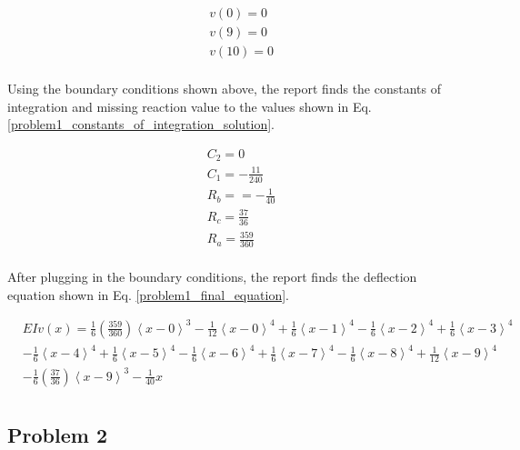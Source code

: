 \documentclass[a4paper]{article}
\begin{document}
\begin{equation}
\begin{split}
	& v(0) = 0 \\
	& v(9) = 0 \\
	& v(10) = 0 \\
\end{split}
\label{problem1_constants_of_integration}
\end{equation}

Using the boundary conditions shown above, the report finds the constants of integration and missing reaction value to the values shown in Eq. \ref{problem1_constants_of_integration_solution}.

\begin{equation}
\begin{split}
	& C_2 = 0 \\
	& C_1 = -\frac{11}{240} \\
	& R_b = =-\frac{1}{40} \\
	& R_c = \frac{37}{36}\\
	& R_a = \frac{359}{360} \\
\end{split}
\label{problem1_constants_of_integration_solution}
\end{equation}

After plugging in the boundary conditions, the report finds the deflection equation shown in Eq. \ref{problem1_final_equation}.

\begin{equation}
\begin{split}
  & EI v(x) = \frac{1}{6}\left(\frac{359}{360}\right)\left<x-0\right>^3 - \frac{1}{12}\left<x-0\right>^4 +  \frac{1}{6}\left<x-1\right>^4 - \frac{1}{6}\left<x-2\right>^4 + \frac{1}{6}\left<x-3\right>^4   \\      
& - \frac{1}{6}\left<x-4\right>^4 +  \frac{1}{6}\left<x-5\right>^4 - \frac{1}{6}\left<x-6\right>^4  +  \frac{1}{6}\left<x-7\right>^4 - \frac{1}{6}\left<x-8\right>^4 +  \frac{1}{12}\left<x-9\right>^4  \\
& - \frac{1}{6}\left( \frac{37}{36}\right)\left<x-9\right>^3 - \frac{1}{40}x \\
\end{split}
\label{problem1_final_equation}
\end{equation}



\subsection{Problem 2}
\end{document}
